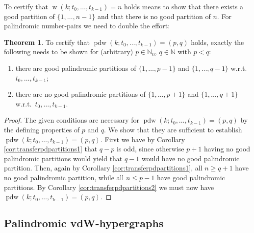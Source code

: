 \documentclass[final,3p,times]{elsarticle}
\theoremstyle{definition}
\newtheorem{thm}{Theorem}[section]
\newcommand{\set}[1]{\{#1\}}
\renewcommand{\leq}{\le} %
\newcommand{\NN}{\mathbb{N}}
\newcommand{\NNZ}{\NN_0}
\DeclareMathOperator{\vdw}{w}
\DeclareMathOperator{\vdwpd}{pdw}
\begin{document}
To certify that $\vdw(k;t_0,\dots,t_{k-1}) = n$ holds means to show that there exists a good partition of $\set{1,\dots,n-1}$ and that there is no good partition of $n$. For palindromic number-pairs we need to double the effort:
\begin{thm}\label{thm:certificatespd}
  To certify that $\vdwpd(k;t_0,\dots,t_{k-1}) = (p,q)$ holds, exactly the following needs to be shown for (arbitrary) $p \in \NNZ$, $q \in \NN$ with $p < q$:
  \begin{enumerate}
  \item[(i)] there are good palindromic partitions of $\set{1,\dots,p-1}$ and $\set{1,\dots,q-1}$ w.r.t.\ $t_0, \dots, t_{k-1}$;
  \item[(ii)] there are no good palindromic partitions of $\set{1,\dots,p+1}$ and $\set{1,\dots,q+1}$ w.r.t.\ $t_0, \dots, t_{k-1}$.
  \end{enumerate}
\end{thm}
\begin{proof}
The given conditions are necessary for $\vdwpd(k;t_0,\dots,t_{k-1}) = (p,q)$ by the defining properties of $p$ and $q$. We show that they are sufficient to establish $\vdwpd(k;t_0,\dots,t_{k-1}) = (p,q)$. First we have by Corollary \ref{cor:transferpdpartitions1} that $q - p$ is odd, since otherwise $p+1$ having no good palindromic partitions would yield that $q-1$ would have no good palindromic partition. Then, again by Corollary \ref{cor:transferpdpartitions1}, all $n \geq q+1$ have no good palindromic partition, while all $n \leq p-1$ have good palindromic partitions. By Corollary \ref{cor:transferpdpartitions2} we must now have $\vdwpd(k;t_0,\dots,t_{k-1}) = (p,q)$.
\end{proof}



\subsection{Palindromic vdW-hypergraphs}
\label{sec:palindvdwh}
\end{document}
